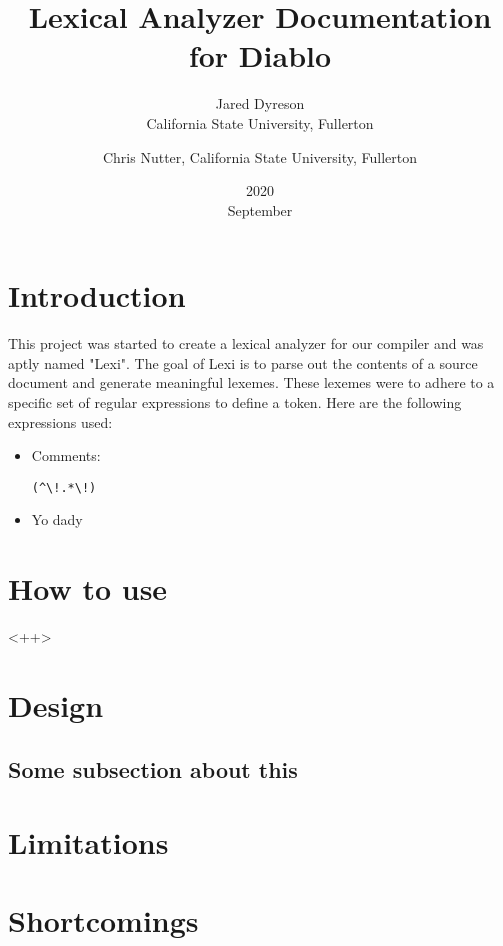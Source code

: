 \documentclass{article}
\title{Lexical Analyzer Documentation for Diablo}
\date{2020\\ September}
\author{Jared Dyreson\\ California State University, Fullerton 
\and Chris Nutter, California State University, Fullerton}
\begin{document}
\maketitle
\tableofcontents
\newpage

\section{Introduction}
This project was started to create a lexical analyzer for our compiler and was aptly named "Lexi".
The goal of Lexi is to parse out the contents of a source document and generate meaningful  lexemes.
These lexemes were to adhere to a specific set of regular expressions to define a token.
Here are the following expressions used:
\begin{itemize}
\item Comments: \begin{Verbatim}[frame=single]
    (^\!.*\!)
\end{Verbatim}
\item Yo dady
\end{itemize}
\newpage
\item 
\section{How to use}
<++>
\section{Design}
\subsection{Some subsection about this}
\section{Limitations}
\section{Shortcomings}
\end{document}
